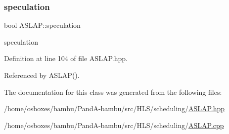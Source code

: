 \subsubsection{\texorpdfstring{speculation}{speculation}}
{\footnotesize\ttfamily bool A\+S\+L\+A\+P\+::speculation\hspace{0.3cm}{\ttfamily [private]}}



speculation 



Definition at line 104 of file A\+S\+L\+A\+P.\+hpp.



Referenced by A\+S\+L\+A\+P().



The documentation for this class was generated from the following files\+:\begin{DoxyCompactItemize}
\item 
/home/osboxes/bambu/\+Pand\+A-\/bambu/src/\+H\+L\+S/scheduling/\hyperlink{ASLAP_8hpp}{A\+S\+L\+A\+P.\+hpp}\item 
/home/osboxes/bambu/\+Pand\+A-\/bambu/src/\+H\+L\+S/scheduling/\hyperlink{ASLAP_8cpp}{A\+S\+L\+A\+P.\+cpp}\end{DoxyCompactItemize}
